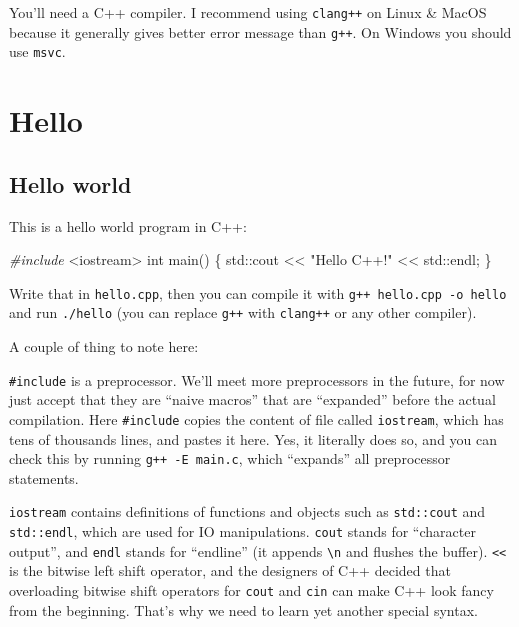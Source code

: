 \documentclass[
]{book}
\newenvironment{Shaded}{\begin{snugshade}}{\end{snugshade}}
\newcommand{\BuiltInTok}[1]{#1}
\newcommand{\DataTypeTok}[1]{\textcolor[rgb]{0.13,0.29,0.53}{#1}}
\newcommand{\ImportTok}[1]{#1}
\newcommand{\NormalTok}[1]{#1}
\newcommand{\PreprocessorTok}[1]{\textcolor[rgb]{0.56,0.35,0.01}{\textit{#1}}}
\newcommand{\StringTok}[1]{\textcolor[rgb]{0.31,0.60,0.02}{#1}}
\begin{document}
You'll need a C++ compiler. I recommend using \texttt{clang++} on Linux \& MacOS because it generally gives better error message than \texttt{g++}. On Windows you should use \texttt{msvc}.

\hypertarget{hello}{%
\chapter{Hello}\label{hello}}

\hypertarget{hello-world}{%
\section{Hello world}\label{hello-world}}

This is a hello world program in C++:

\begin{Shaded}
\begin{Highlighting}[]
\PreprocessorTok{\#include }\ImportTok{\textless{}iostream\textgreater{}}
\DataTypeTok{int}\NormalTok{ main()}
\NormalTok{\{}
    \BuiltInTok{std::}\NormalTok{cout \textless{}\textless{} }\StringTok{"Hello C++!"}\NormalTok{ \textless{}\textless{} }\BuiltInTok{std::}\NormalTok{endl;}
\NormalTok{\}}
\end{Highlighting}
\end{Shaded}

Write that in \texttt{hello.cpp}, then you can compile it with \texttt{g++\ hello.cpp\ -o\ hello} and run \texttt{./hello} (you can replace \texttt{g++} with \texttt{clang++} or any other compiler).

A couple of thing to note here:

\texttt{\#include} is a preprocessor. We'll meet more preprocessors in the future, for now just accept that they are ``naive macros'' that are ``expanded'' before the actual compilation.
Here \texttt{\#include} copies the content of file called \texttt{iostream}, which has tens of thousands lines, and pastes it here. Yes, it literally does so, and you can check this by running \texttt{g++\ -E\ main.c}, which ``expands'' all preprocessor statements.

\texttt{iostream} contains definitions of functions and objects such as \texttt{std::cout} and \texttt{std::endl}, which are used for IO manipulations. \texttt{cout} stands for ``character output'', and \texttt{endl} stands for ``endline'' (it appends \texttt{\textbackslash{}n} and flushes the buffer). \texttt{\textless{}\textless{}} is the bitwise left shift operator, and the designers of C++ decided that overloading bitwise shift operators for \texttt{cout} and \texttt{cin} can make C++ look fancy from the beginning. That's why we need to learn yet another special syntax.
\end{document}
